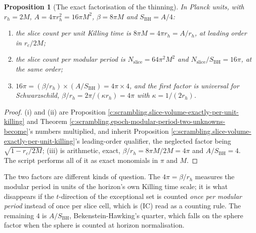 \documentclass[11pt]{article}
\newtheorem{proposition}[theorem]{Proposition}
\theoremstyle{definition}
\theoremstyle{plain}
\providecommand{\SBH}{}\renewcommand{\SBH}{S_{\mathrm{BH}}}
\begin{document}
\begin{proposition}[The exact factorisation of the thinning]\label{c:scrambling.exact-factorisation-thinning}
In Planck units, with $r_h = 2M$, $A = 4\pi r_h^2 = 16\pi M^2$, $\beta = 8\pi M$ and $\SBH = A/4$:
\begin{enumerate}
\item[(i)] the slice count per unit Killing time is $8\pi M = 4\pi r_h = A/r_h$, at leading order in $r_c/2M$;
\item[(ii)] the slice count per modular period is $N_{\mathrm{slice}} = 64\pi^2 M^2$ and $N_{\mathrm{slice}}/\SBH = 16\pi$, at the same order;
\item[(iii)] $16\pi = (\beta/r_h) \times (A/\SBH) = 4\pi \times 4$, and the first factor is universal for Schwarzschild, $\beta/r_h = 2\pi/(\kappa r_h) = 4\pi$ with $\kappa = 1/(2r_h)$.
\end{enumerate}
\end{proposition}
\begin{proof}
(i) and (ii) are Proposition \ref{c:scrambling.slice-volume-exactly-per-unit-killing} and Theorem \ref{c:scrambling.epoch-modular-period-two-unknowns-become}'s numbers multiplied, and inherit Proposition \ref{c:scrambling.slice-volume-exactly-per-unit-killing}'s leading-order qualifier, the neglected factor being $\sqrt{1 - r_c/2M}$; (iii) is arithmetic, exact, $\beta/r_h = 8\pi M/2M = 4\pi$ and $A/\SBH = 4$. The script performs all of it as exact monomials in $\pi$ and $M$.

\end{proof}

\label{c:note.scrambling.setting-calibration-factorised-quarter-examined-2}
The two factors are different kinds of question. The $4\pi = \beta/r_h$ measures the modular period in units of the horizon's own Killing time scale; it is what disappears if the $t$-direction of the exceptional set is counted \emph{once per modular period} instead of once per slice cell, which is (IC) read as a counting rule. The remaining $4$ is $A/\SBH$, Bekenstein-Hawking's quarter, which falls on the sphere factor when the sphere is counted at horizon normalisation.
\end{document}
